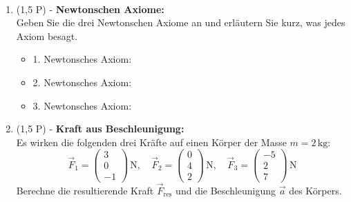 \documentclass[11pt, a4paper]{article}
\begin{document}
\newpage
$\,$
\newpage

\begin{enumerate}[label=\textbf{\arabic*.},itemsep=0.45cm]
    \vspace{0cm}

    \item (1,5 P) - \textbf{Newtonschen Axiome:} \\
    Geben Sie die drei Newtonschen Axiome an und erläutern Sie kurz, was jedes Axiom besagt.
    \begin{itemize}
        \item 1. Newtonsches Axiom: \\[0.03cm]
        \item 2. Newtonsches Axiom: \\[0.03cm]
        \item 3. Newtonsches Axiom:
    \end{itemize}

    \item (1,5 P) - \textbf{Kraft aus Beschleunigung:} \\
    Es wirken die folgenden drei Kräfte auf einen Körper der Masse \(m = 2\, \text{kg}\): 
    \begin{equation*}
        \vec{F}_1 = \begin{pmatrix} 3 \\ 0 \\ -1 \end{pmatrix} \, \text{N}, \quad \vec{F}_2 = \begin{pmatrix} 0 \\ 4 \\ 2 \end{pmatrix} \, \text{N}, \quad \vec{F}_3 = \begin{pmatrix} -5 \\ 2 \\ 7 \end{pmatrix} \, \text{N}
    \end{equation*}
    Berechne die resultierende Kraft \(\vec{F}_{\text{res}}\) und die Beschleunigung \(\vec{a}\) des Körpers.


\end{enumerate}
\end{document}
